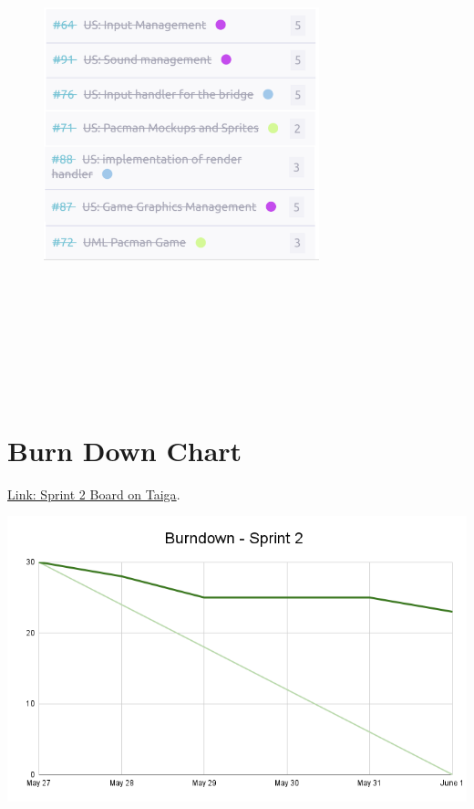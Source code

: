 \documentclass{article}
\begin{document}
\begin{figure}
\centering
\includegraphics[width=8cm, height=15cm]{./assets/us-s2.png}
\end{figure}

\hypertarget{burndownchart-s2}{
\section{Burn Down Chart}\label{Burn Down Chart S2}}
\href{https://tree.taiga.io/project/joseluis-teran-coffeetime/taskboard/sprint-2-12274}{Link: Sprint 2 Board on Taiga}.

\includegraphics[width=\textwidth]{./assets/Burndown - Sprint 2.png}
\end{document}
